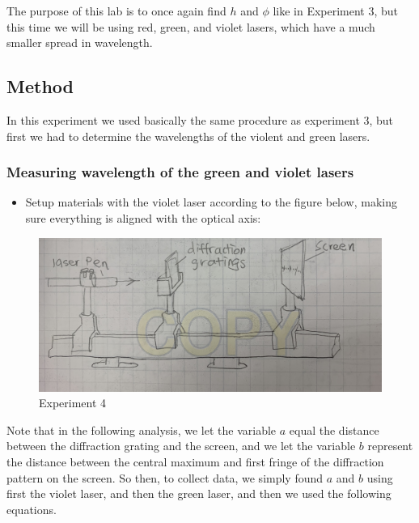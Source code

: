 \documentclass[11pt]{article}
\makeatletter
\def\maxwidth{\ifdim\Gin@nat@width>\linewidth\linewidth
    \else\Gin@nat@width\fi}
\let\Oldincludegraphics\includegraphics
\renewcommand{\includegraphics}[1]{\Oldincludegraphics[width=.8\maxwidth]{#1}}
\providecommand{\tightlist}{%
      \setlength{\itemsep}{0pt}\setlength{\parskip}{0pt}}
\makeatother
\begin{document}
The purpose of this lab is to once again find \(h\) and \(\phi\) like in
Experiment 3, but this time we will be using red, green, and violet
lasers, which have a much smaller spread in wavelength.

    \hypertarget{method}{
\subsection{Method}\label{method}}

In this experiment we used basically the same procedure as experiment 3,
but first we had to determine the wavelengths of the violent and green
lasers.

\hypertarget{measuring-wavelength-of-the-green-and-violet-lasers}{%
\subsubsection{Measuring wavelength of the green and violet
lasers}\label{measuring-wavelength-of-the-green-and-violet-lasers}}

\begin{itemize}
\tightlist
\item
  Setup materials with the violet laser according to the figure below,
  making sure everything is aligned with the optical axis:
\end{itemize}

\begin{figure}
\centering
\includegraphics{fig1.jpg}
\caption{Experiment 4}
\end{figure}

    Note that in the following analysis, we let the variable \(a\) equal the
distance between the diffraction grating and the screen, and we let the
variable \(b\) represent the distance between the central maximum and
first fringe of the diffraction pattern on the screen. So then, to
collect data, we simply found \(a\) and \(b\) using first the violet
laser, and then the green laser, and then we used the following
equations.
\end{document}
